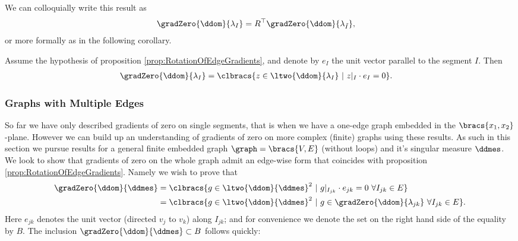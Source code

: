 We can colloquially write this result as
\begin{align*}
	\gradZero{\ddom}{\lambda_I} &= R^\top\gradZero{\ddom}{\lambda_{\tilde{I}}},
\end{align*}
or more formally as in the following corollary.
\begin{cory} \label{cory:Grad0SingleEdge}
	Assume the hypothesis of proposition \ref{prop:RotationOfEdgeGradients}, and denote by $e_I$ the unit vector parallel to the segment $I$.
	Then
	\begin{align*}
		\gradZero{\ddom}{\lambda_I} &= \clbracs{z\in\ltwo{\ddom}{\lambda_I} \ \vert \ z\vert_{I}\cdot e_I = 0}.
	\end{align*}
\end{cory}

\subsubsection{Graphs with Multiple Edges}
So far we have only described gradients of zero on single segments, that is when we have a one-edge graph embedded in the $\bracs{x_1,x_2}$-plane.
However we can build up an understanding of gradients of zero on more complex (finite) graphs using these results.
As such in this section we pursue results for a general finite embedded graph $\graph = \bracs{V,E}$ (without loops) and it's singular measure $\ddmes$.
We look to show that gradients of zero on the whole graph admit an edge-wise form that coincides with proposition \ref{prop:RotationOfEdgeGradients}.
Namely we wish to prove that
\begin{align*}
	\gradZero{\ddom}{\ddmes} &= \clbracs{g\in\ltwo{\ddom}{\ddmes}^2 \ \vert \ g\vert_{I_{jk}}\cdot e_{jk}=0 \ \forall I_{jk}\in E} \\
	&= \clbracs{g\in\ltwo{\ddom}{\ddmes}^2 \ \vert \ g\in\gradZero{\ddom}{\lambda_{jk}} \ \forall I_{jk}\in E}.
\end{align*}
Here $e_{jk}$ denotes the unit vector (directed $v_j$ to $v_k$) along $I_{jk}$; and for convenience we denote the set on the right hand side of the equality by $B$.
The inclusion $\gradZero{\ddom}{\ddmes} \subset B$ follows quickly:

